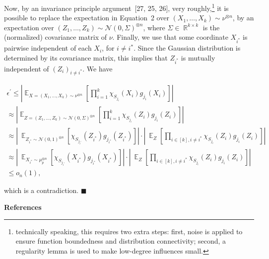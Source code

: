 Now, by an invariance principle argument [27, 25, 26], very roughly,\footnote{technically speaking, this requires two extra steps: first, noise is applied to ensure function boundedness and distribution connectivity; second, a regularity lemma is used to make low-degree influences small.} it is possible to replace the expectation in Equation 2 over $(X_{1},\dots,X_{k})\sim\nu^{\otimes n}$, by an expectation over $(Z_{1},\dots,Z_{k})\sim\mathcal{N}(0,\Sigma)^{\otimes n}$, where $\Sigma\in\mathop{\mathbb{R}}^{k\times k}$ is the (normalized) covariance matrix of $\nu$.
Finally, we use that some coordinate $X_{i^{*}}$ is pairwise independent of each $X_{i}$, for $i\not=i^{*}$.
Since the Gaussian distribution is determined by its covariance matrix, this implies that $Z_{i^{*}}$ is mutually independent of $(Z_{i})_{i\not=i^{*}}$.
We have\par


\[\begin{gathered}
\displaystyle\epsilon^{\prime} \displaystyle\leqslant\left|\mathop{\mathbb{E}}_{X=(X_{1},\dots,X_{k})\sim\nu^{\otimes n}}\left[\prod_{i=1}^{k}\chi_{S_{j_{i}}}(X_{i})g_{j_{i}}(X_{i})\right]\right| \\
\displaystyle\approx\left|\mathop{\mathbb{E}}_{Z=(Z_{1},\dots,Z_{k})\sim\mathcal{N}(0,\Sigma)^{\otimes n}}\left[\prod_{i=1}^{k}\chi_{S_{j_{i}}}(Z_{i})g_{j_{i}}(Z_{i})\right]\right| \\
\displaystyle\approx\left|\ \mathop{\mathbb{E}}_{Z_{i^{*}}\sim\mathcal{N}(0,1)^{\otimes n}}\left[\chi_{S_{j_{i^{*}}}}(Z_{i^{*}})g_{j_{i^{*}}}(Z_{i^{*}})\right]\right|\cdot\left|\ \mathop{\mathbb{E}}_{Z}\left[\prod_{i\in[k],i\not=i^{*}}\chi_{S_{j_{i}}}(Z_{i})g_{j_{i}}(Z_{i})\right]\right| \\
\displaystyle\approx\left|\ \mathop{\mathbb{E}}_{X_{i^{*}}\sim\mu_{p}^{\otimes
n}}\left[\chi_{S_{j_{i^{*}}}}(X_{i^{*}})g_{j_{i^{*}}}(X_{i^{*}})\right]\right|\cdot\left|\ \mathop{\mathbb{E}}_{Z}\left[\prod_{i\in[k],i\not=i^{*}}\chi_{S_{j_{i}}}(Z_{i})g_{j_{i}}(Z_{i})\right]\right| \\
\displaystyle\leqslant o_{n}(1),
\end{gathered}\]


which is a contradiction.
\ensuremath{\blacksquare}\par






\par\medskip\noindent\textbf{References}\par



